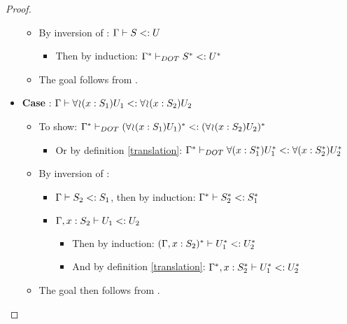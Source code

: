 \begin{proof}
\begin{itemize}
\begin{itemize}
\begin{itemize}
            \end{itemize}
            \item By inversion of : $\Gamma \vdash S <: U$
            \begin{itemize}
                \item Then by induction:
                    $\Gamma^{*} \vdash_{DOT} S^{*} <: U^{*}$
            \end{itemize}
            \item The goal follows from .
        \end{itemize}
        \item \textbf{Case} :
            $\Gamma \vdash \forall\!\wr\!(x:S_1)U_1 <: \forall\!\wr\!(x:S_2)U_2$
        \begin{itemize}
            \item To show: $\Gamma^{*} \vdash_{DOT} (\forall\!\wr\!(x:S_1)U_1)^{*} <: (\forall\!\wr\!(x:S_2)U_2)^{*}$
            \begin{itemize}
                \item Or by definition \ref{translation}:
                    $\Gamma^{*} \vdash_{DOT} \forall(x:S_1^{*})U_1^{*} <: \forall(x:S_2^{*})U_2^{*}$
            \end{itemize}
            \item By inversion of :
            \begin{itemize}
                \item $\Gamma \vdash S_2 <: S_1$, then by induction:
                    $\Gamma^{*} \vdash S_2^{*} <: S_1^{*}$
                \item $\Gamma, x: S_2 \vdash U_1 <: U_2$
                \begin{itemize}
                    \item Then by induction: $(\Gamma, x: S_2)^{*} \vdash U_1^{*} <: U_2^{*}$
                    \item And by definition \ref{translation}:
                        $\Gamma^{*}, x:
                        S_2^{*} \vdash U_1^{*} <: U_2^{*}$
                \end{itemize}
            \end{itemize}
            \item The goal then follows from .
        \end{itemize}
    \end{itemize}
\end{proof}

